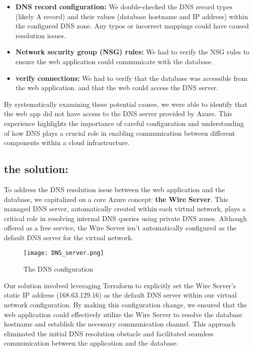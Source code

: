 \begin{itemize}
    \item \textbf{DNS record configuration:} We double-checked the DNS record types (likely A record) and their values (database hostname and IP address) within the configured DNS zone. Any typos or incorrect mappings could have caused resolution issues.
    \item \textbf{Network security group (NSG) rules:} We had to verify the NSG rules to ensure the web application could communicate with the database.
    \item \textbf{verify connections:} We had to verify that the database was accessible from the web application. and that the web could access the DNS server.
\end{itemize}
By systematically examining these potential causes, we were able to identify that the web app did not have access to the DNS server provided by Azure. This experience highlights the importance of careful configuration and understanding of how DNS plays a crucial role in enabling communication between different components within a cloud infrastructure.
\subsection*{the solution:}
To address the DNS resolution issue between the web application and the database, we capitalized on a core Azure concept: \textbf{the Wire Server}. This managed DNS server, automatically created within each virtual network, plays a critical role in resolving internal DNS queries using private DNS zones. Although offered as a free service, the Wire Server isn't automatically configured as the default DNS server for the virtual network.

\begin{figure}[htpb]
    \centering
    \texttt{[image: DNS\_server.png]}
    \caption{The DNS configuration}
    \label{fig:dns_configuration}
\end{figure}

Our solution involved leveraging Terraform to explicitly set the Wire Server's static IP address (168.63.129.16) as the default DNS server within our virtual network configuration. By making this configuration change, we ensured that the web application could effectively utilize the Wire Server to resolve the database hostname and establish the necessary communication channel. This approach eliminated the initial DNS resolution obstacle and facilitated seamless communication between the application and the database.

